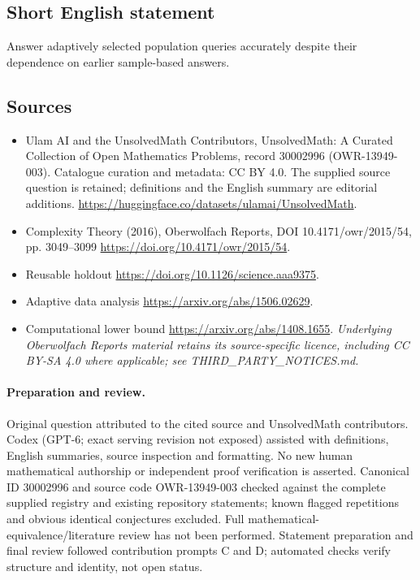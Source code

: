 \documentclass[11pt]{article}
\begin{document}
\subsection{Short English statement}
Answer adaptively selected population queries accurately despite their dependence on earlier sample-based answers.
\subsection{Sources}
\begin{itemize}
\item[\hypertarget{source:30002996:1}{S1}] Ulam AI and the UnsolvedMath Contributors, UnsolvedMath: A Curated Collection of Open Mathematics Problems, record 30002996 (OWR-13949-003). Catalogue curation and metadata: CC BY 4.0. The supplied source question is retained; definitions and the English summary are editorial additions.
\url{https://huggingface.co/datasets/ulamai/UnsolvedMath}.
\item[\hypertarget{source:30002996:2}{S2}] Complexity Theory (2016), Oberwolfach Reports, DOI 10.4171/owr/2015/54, pp. 3049--3099
\url{https://doi.org/10.4171/owr/2015/54}.
\item[\hypertarget{source:30002996:3}{S3}] Reusable holdout
\url{https://doi.org/10.1126/science.aaa9375}.
\item[\hypertarget{source:30002996:4}{S4}] Adaptive data analysis
\url{https://arxiv.org/abs/1506.02629}.
\item[\hypertarget{source:30002996:5}{S5}] Computational lower bound
\url{https://arxiv.org/abs/1408.1655}.
\textit{Underlying Oberwolfach Reports material retains its source-specific licence, including CC BY-SA 4.0 where applicable; see THIRD\_PARTY\_NOTICES.md.}
\end{itemize}
\paragraph{Preparation and review.}
Original question attributed to the cited source and UnsolvedMath contributors. Codex (GPT-6; exact serving revision not exposed) assisted with definitions, English summaries, source inspection and formatting. No new human mathematical authorship or independent proof verification is asserted. Canonical ID 30002996 and source code OWR-13949-003 checked against the complete supplied registry and existing repository statements; known flagged repetitions and obvious identical conjectures excluded. Full mathematical-equivalence/literature review has not been performed. Statement preparation and final review followed contribution prompts C and D; automated checks verify structure and identity, not open status.
\label{end:30002996}
\end{document}
